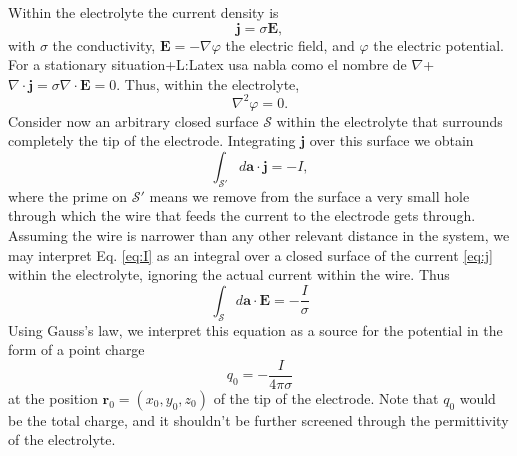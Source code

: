 \documentclass{article}
\newcommand{\notaL}[1]{{\color{blue}+L:#1+}}
\begin{document}
Within the electrolyte the current density is
\begin{equation}
  \label{eq:j}
  \bm j=\sigma\bm E,
\end{equation}
with
$\sigma$ the conductivity, $\bm E=-\nabla\varphi$ the electric field,
and $\varphi$ the electric potential. For a
stationary situation\notaL{Latex usa nabla como el nombre de
  $\nabla$}
$\nabla\cdot \bm j = \sigma\nabla\cdot\bm E=0$. Thus, within the electrolyte,
\begin{equation}
  \label{eq:laplace}
\nabla^{2} \varphi=0.
\end{equation}
Consider now an arbitrary closed surface
$\mathcal S$
within the electrolyte that surrounds completely the tip of the
electrode. Integrating $ \bm j$ over this surface we obtain
\begin{equation}
  \label{eq:I}
\int_{\mathcal S'} d\bm a \cdot \bm j = -I,
\end{equation}
where the prime on $\mathcal S'$ means we remove from the surface a
very small hole through which the wire that feeds the current to the
electrode gets
through. Assuming the wire is narrower than any other relevant
distance in the system, we may interpret Eq. \eqref{eq:I} as an
integral over a closed surface of the current \eqref{eq:j} within the
electrolyte, ignoring the actual current within the wire. Thus
\begin{equation}
  \label{eq:gauss}
  \int_{\mathcal S} d\bm a \cdot \bm E = -\frac{I}{\sigma}
\end{equation}
Using Gauss's law, we interpret this equation as a source for the
potential in the form of a point charge
\begin{equation}
  q_0 = -\frac{I}{4 \pi \sigma}
\end{equation}
at the position $\bm r_0=(x_0, y_0, z_0)$ of the
tip of the electrode. Note that $q_0$ would be the total charge,
and it shouldn't be further screened through the permittivity of the
electrolyte.
\end{document}
